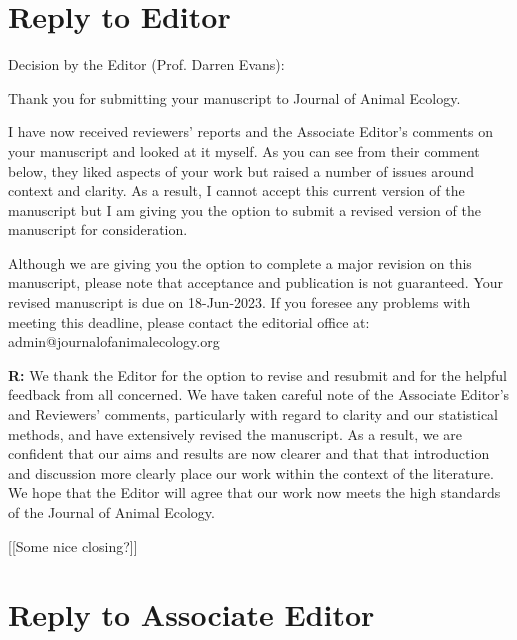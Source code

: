 \documentclass[12pt]{article}
\newenvironment{refquote}{\bigskip \begin{it}}{\end{it}\medskip}
\begin{document}

\section*{Reply to Editor}

    \begin{refquote}
        Decision by the Editor (Prof. Darren Evans):

        Thank you for submitting your manuscript to Journal of Animal Ecology.

        I have now received reviewers' reports and the Associate Editor's comments on your manuscript and looked at it myself. As you can see from their comment below, they liked aspects of your work but raised a number of issues around context and clarity. As a result, I cannot accept this current version of the manuscript but I am giving you the option to submit a revised version of the manuscript for consideration.

        Although we are giving you the option to complete a major revision on this manuscript, please note that acceptance and publication is not guaranteed. Your revised manuscript is due on 18-Jun-2023. If you foresee any problems with meeting this deadline, please contact the editorial office at: admin@journalofanimalecology.org

    \end{refquote}
    

    \textbf{R:} We thank the Editor for the option to revise and resubmit and for the helpful feedback from all concerned. We have taken careful note of the Associate Editor's and Reviewers' comments, particularly with regard to clarity and our statistical methods, and have extensively revised the manuscript. As a result, we are confident that our aims and results are now clearer and that that introduction and discussion more clearly place our work within the context of the literature. We hope that the Editor will agree that our work now meets the high standards of the Journal of Animal Ecology.

    [[Some nice closing?]]


\clearpage

\section*{Reply to Associate Editor}
\end{document}
